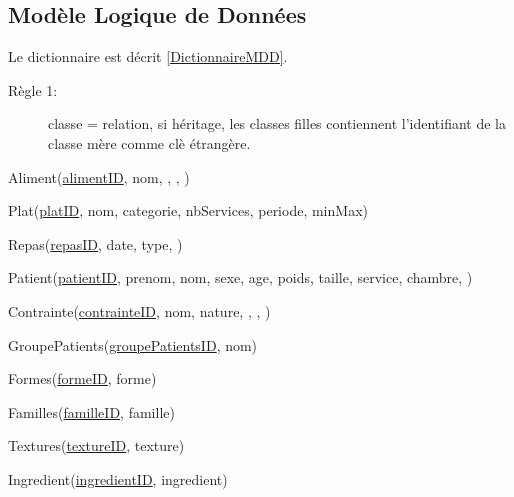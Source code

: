\subsection{Modèle Logique de Données}
Le dictionnaire est décrit \autoref{DictionnaireMDD}.
\begin{description}
\item[Règle 1:] classe = relation, si héritage, les classes filles contiennent l'identifiant de la classe mère comme clè étrangère.
\end{description}

Aliment(\underline{alimentID}, nom, , , )


Plat(\underline{platID}, nom, categorie, nbServices, periode, minMax)


Repas(\underline{repasID}, date, type, )

Patient(\underline{patientID}, prenom, nom, sexe, age, poids, taille, service, chambre, )


Contrainte(\underline{contrainteID}, nom, nature, , , )


GroupePatients(\underline{groupePatientsID}, nom)

Formes(\underline{formeID}, forme)

Familles(\underline{familleID}, famille)

Textures(\underline{textureID}, texture)

Ingredient(\underline{ingredientID}, ingredient)



